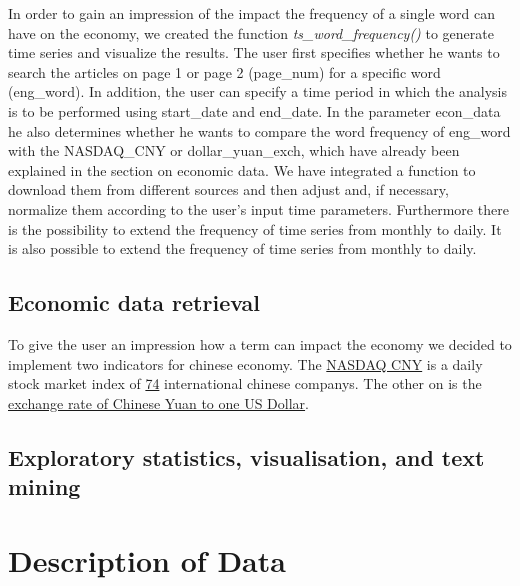 \documentclass[12pt,a4paper]{article}
\begin{document}
In order to gain an impression of the impact the frequency of a single word can have on the economy, we created the function \emph{ts\_word\_frequency()} to generate time series and visualize the results. The user first specifies whether he wants to search the articles on page 1 or page 2 (page\_num) for a specific word (eng\_word). In addition, the user can specify a time period in which the analysis is to be performed using start\_date and end\_date. In the parameter econ\_data he also determines whether he wants to compare the word frequency of eng\_word with the NASDAQ\_CNY or dollar\_yuan\_exch, which have already been explained in the section on economic data. We have integrated a function to download them from different sources and then adjust and, if necessary, normalize them according to the user's input time parameters. Furthermore there is the possibility to extend the frequency of time series from monthly to daily. It is also possible to extend the frequency of time series from monthly to daily.

\hypertarget{economic-data-retrieval}{%
\subsection{Economic data retrieval}\label{economic-data-retrieval}}

To give the user an impression how a term can impact the economy we decided to implement two indicators for chinese economy. The \href{https://www.quandl.com/data/NASDAQOMX/NQCN2000CNY-NASDAQ-China-Inds-CNY-Index-NQCN2000CNY}{NASDAQ CNY} is a daily stock market index of \href{https://indexes.nasdaqomx.com/Index/Weighting/NQCN2000CNY}{74} international chinese companys. The other on is the \href{https://fred.stlouisfed.org/series/DEXCHUS}{exchange rate of Chinese Yuan to one US Dollar}.

\hypertarget{exploratory-statistics-visualisation-and-text-mining}{%
\subsection{Exploratory statistics, visualisation, and text mining}\label{exploratory-statistics-visualisation-and-text-mining}}

\hypertarget{description-of-data}{%
\section{Description of Data}\label{description-of-data}}
\end{document}
